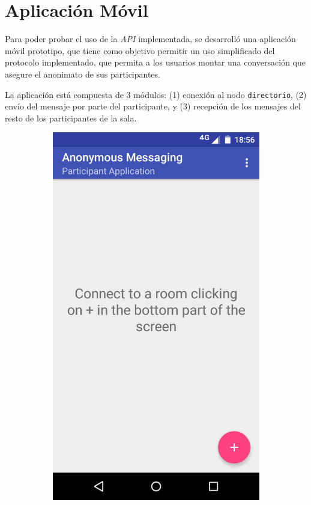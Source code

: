 {\section{Aplicación Móvil}

Para poder probar el uso de la \emph{API} implementada, se desarrolló una 
aplicación móvil prototipo, que tiene como objetivo permitir un uso simplificado 
del protocolo implementado, que permita a los usuarios montar una conversación 
que asegure el anonimato de sus participantes.

La aplicación está compuesta de 3 módulos: (1) conexión al nodo \texttt{directorio}, (2) envío 
del mensaje por parte del participante, y (3) recepción de los mensajes 
del resto de los participantes de la sala.

\begin{figure}[H]
    \centering
    \begin{subfigure}[b]{0.4\textwidth}
        \includegraphics[width=\textwidth]{imagenes/mobile_first.png}

\end{subfigure}
\end{figure}}
